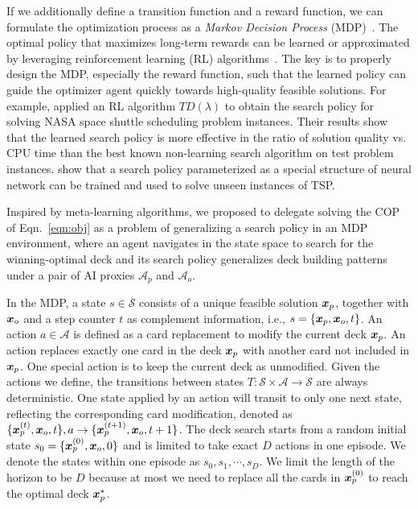 If we additionally define a transition function and a reward function, we can formulate the optimization process as a \textit{Markov Decision Process} (MDP)~\citep{bellman1957markovian}. The optimal policy that maximizes long-term rewards can be learned or approximated by leveraging reinforcement learning (RL) algorithms~\citep{sutton1998reinforcement}. The key is to properly design the MDP, especially the reward function, such that the learned policy can guide the optimizer agent quickly towards high-quality feasible solutions. For example, \textcite{zhang2000solving} applied an RL algorithm $TD(\lambda)$ to obtain the search policy for solving NASA space shuttle scheduling problem instances. Their results show that the learned search policy is more effective in the ratio of solution quality vs. CPU time than the best known non-learning search algorithm on test problem instances. \textcite{bello2016neural} show that a search policy parameterized as a special structure of neural network can be trained and used to solve unseen instances of TSP. 

Inspired by meta-learning algorithms, we proposed to delegate solving the COP of Eqn.~\ref{eqn:obj} as a problem of generalizing a search policy in an MDP environment, where an agent navigates in the state space to search for the winning-optimal deck and its search policy generalizes deck building patterns under a pair of AI proxies $\mathcal{A}_p$ and $\mathcal{A}_o$. 

In the MDP, a state $s \in \mathcal{S}$ consists of a unique feasible solution $\boldsymbol{x}_p$, together with $\boldsymbol{x}_o$ and a step counter $t$ as complement information, i.e., $s=\{\boldsymbol{x}_p, \boldsymbol{x}_o, t\}$. An action $a \in \mathcal{A}$ is defined as a card replacement to modify the current deck $\boldsymbol{x}_p$. An action replaces exactly one card in the deck $\boldsymbol{x}_p$ with another card not included in $\boldsymbol{x}_p$. One special action is to keep the current deck as unmodified. Given the actions we define, the transitions between states $T: \mathcal{S} \times \mathcal{A} \rightarrow \mathcal{S}$ are always deterministic. One state applied by an action will transit to only one next state, reflecting the corresponding card modification, denoted as $\{\boldsymbol{x}^{(t)}_p, \boldsymbol{x}_o, t\}, a \rightarrow \{\boldsymbol{x}^{(t+1)}_p, \boldsymbol{x}_o, t+1\}$. The deck search starts from a random initial state $s_0=\{\boldsymbol{x}_p^{(0)}, \boldsymbol{x}_o, 0\}$ and is limited to take exact $D$ actions in one episode. We denote the states within one episode as $s_0, s_1, \cdots, s_D$. We limit the length of the horizon to be $D$ because at most we need to replace all the cards in $\boldsymbol{x}_p^{(0)}$ to reach the optimal deck $\boldsymbol{x}_p^*$. 


